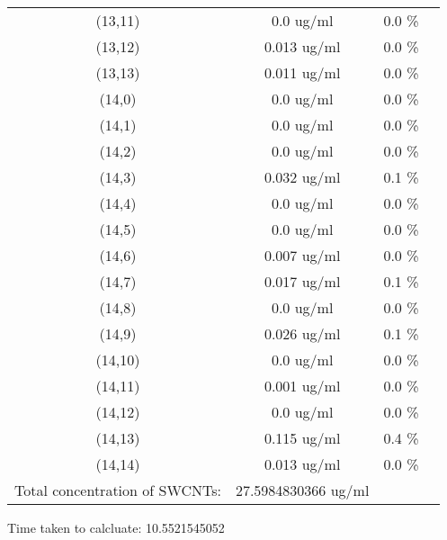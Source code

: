 \documentclass{article}
\begin{document}
\begin{tabular}{c c c c}
(13,11)&        0.0 ug/ml        &0.0 \%\\
(13,12)&        0.013 ug/ml        &0.0 \%\\
(13,13)&        0.011 ug/ml        &0.0 \%\\
(14,0)&        0.0 ug/ml        &0.0 \%\\
(14,1)&        0.0 ug/ml        &0.0 \%\\
(14,2)&        0.0 ug/ml        &0.0 \%\\
(14,3)&        0.032 ug/ml        &0.1 \%\\
(14,4)&        0.0 ug/ml        &0.0 \%\\
(14,5)&        0.0 ug/ml        &0.0 \%\\
(14,6)&        0.007 ug/ml        &0.0 \%\\
(14,7)&        0.017 ug/ml        &0.1 \%\\
(14,8)&        0.0 ug/ml        &0.0 \%\\
(14,9)&        0.026 ug/ml        &0.1 \%\\
(14,10)&        0.0 ug/ml        &0.0 \%\\
(14,11)&        0.001 ug/ml        &0.0 \%\\
(14,12)&        0.0 ug/ml        &0.0 \%\\
(14,13)&        0.115 ug/ml        &0.4 \%\\
(14,14)&        0.013 ug/ml        &0.0 \%\\
Total concentration of SWCNTs: &27.5984830366 ug/ml\\

\end{tabular}

Time taken to calcluate: 10.5521545052
\end{document}
